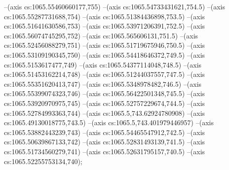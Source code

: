--(axis cs:1065.55460660177,755)
--(axis cs:1065.54733431621,754.5)
--(axis cs:1065.55287731688,754)
--(axis cs:1065.51384436898,753.5)
--(axis cs:1065.51641630586,753)
--(axis cs:1065.53971206391,752.5)
--(axis cs:1065.56074745295,752)
--(axis cs:1065.565606131,751.5)
--(axis cs:1065.52456088279,751)
--(axis cs:1065.51719675946,750.5)
--(axis cs:1065.53109190345,750)
--(axis cs:1065.54418646372,749.5)
--(axis cs:1065.5153617477,749)
--(axis cs:1065.54377114048,748.5)
--(axis cs:1065.51453162214,748)
--(axis cs:1065.51244037557,747.5)
--(axis cs:1065.55351620413,747)
--(axis cs:1065.5348978482,746.5)
--(axis cs:1065.55399074323,746)
--(axis cs:1065.56422501348,745.5)
--(axis cs:1065.53920970975,745)
--(axis cs:1065.52757229674,744.5)
--(axis cs:1065.52784993363,744)
--(axis cs:1065.5,743.62924780908)
--(axis cs:1065.49130018775,743.5)
--(axis cs:1065.5,743.401979446957)
--(axis cs:1065.53882443239,743)
--(axis cs:1065.54465547912,742.5)
--(axis cs:1065.50639867133,742)
--(axis cs:1065.52831493139,741.5)
--(axis cs:1065.51734560279,741)
--(axis cs:1065.52631795157,740.5)
--(axis cs:1065.52255753134,740);

